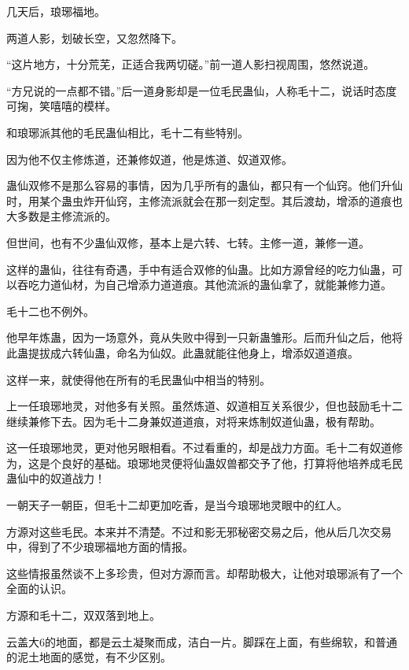 
\begin{this_body}



几天后，琅琊福地。

两道人影，划破长空，又忽然降下。

“这片地方，十分荒芜，正适合我两切磋。”前一道人影扫视周围，悠然说道。

“方兄说的一点都不错。”后一道身影却是一位毛民蛊仙，人称毛十二，说话时态度可掬，笑嘻嘻的模样。

和琅琊派其他的毛民蛊仙相比，毛十二有些特别。

因为他不仅主修炼道，还兼修奴道，他是炼道、奴道双修。

蛊仙双修不是那么容易的事情，因为几乎所有的蛊仙，都只有一个仙窍。他们升仙时，用某个蛊虫炸开仙窍，主修流派就会在那一刻定型。其后渡劫，增添的道痕也大多数是主修流派的。

但世间，也有不少蛊仙双修，基本上是六转、七转。主修一道，兼修一道。

这样的蛊仙，往往有奇遇，手中有适合双修的仙蛊。比如方源曾经的吃力仙蛊，可以吞吃力道仙材，为自己增添力道道痕。其他流派的蛊仙拿了，就能兼修力道。

毛十二也不例外。

他早年炼蛊，因为一场意外，竟从失败中得到一只新蛊雏形。后而升仙之后，他将此蛊提拔成六转仙蛊，命名为仙奴。此蛊就能往他身上，增添奴道道痕。

这样一来，就使得他在所有的毛民蛊仙中相当的特别。

上一任琅琊地灵，对他多有关照。虽然炼道、奴道相互关系很少，但也鼓励毛十二继续兼修下去。因为毛十二身兼奴道道痕，对将来炼制奴道仙蛊，极有帮助。

这一任琅琊地灵，更对他另眼相看。不过看重的，却是战力方面。毛十二有奴道修为，这是个良好的基础。琅琊地灵便将仙蛊奴兽都交予了他，打算将他培养成毛民蛊仙中的奴道战力！

一朝天子一朝臣，但毛十二却更加吃香，是当今琅琊地灵眼中的红人。

方源对这些毛民。本来并不清楚。不过和影无邪秘密交易之后，他从后几次交易中，得到了不少琅琊福地方面的情报。

这些情报虽然谈不上多珍贵，但对方源而言。却帮助极大，让他对琅琊派有了一个全面的认识。

方源和毛十二，双双落到地上。

云盖大6的地面，都是云土凝聚而成，洁白一片。脚踩在上面，有些绵软，和普通的泥土地面的感觉，有不少区别。


\end{this_body}
